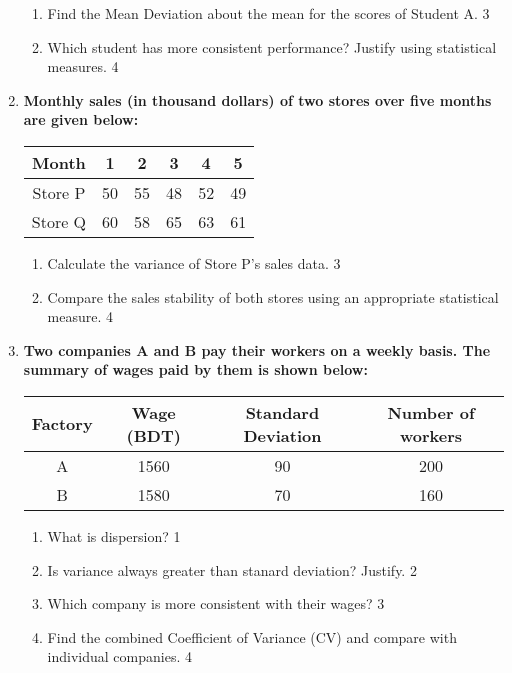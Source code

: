 \documentclass[a4paper,oneside]{book}
\begin{document}
\begin{enumerate}
  \begin{enumerate}
    \item  
	Find the Mean Deviation about the mean for the scores of Student A.  \hfill 3  
    \item  
	Which student has more consistent performance? Justify using statistical measures.  \hfill 4  
\end{enumerate}  

\item  
  \textbf{Monthly sales (in thousand dollars) of two stores over five months are given below:}

\begin{table}[h]
\centering
\begin{tabular}{c|ccccc}
Month     & 1  & 2  & 3  & 4  & 5  \\ \hline
Store P  & 50 & 55 & 48 & 52 & 49 \\
Store Q  & 60 & 58 & 65 & 63 & 61
\end{tabular}
\end{table}

  \begin{enumerate}
    \item  
	Calculate the variance of Store P’s sales data.  \hfill 3  
    \item  
	Compare the sales stability of both stores using an appropriate statistical measure.  \hfill 4  
\end{enumerate}  


 \item
	  \textbf{Two companies A and B pay their workers on a weekly basis. The summary of wages paid by them is shown below:} 
	  
	  \begin{table}[h]
	  \centering
\begin{tabular}{c|ccc}
Factory & Wage (BDT) & Standard Deviation & Number of workers \\ \hline
A       & 1560       & 90                 & 200               \\ 
B       & 1580       & 70                 & 160              
\end{tabular}
\end{table}
  
  \begin{enumerate}
    \item
	What is dispersion? \hfill 1
    \item
	Is variance always greater than stanard deviation? Justify. \hfill 2
    \item  
	Which company is more consistent with their wages? \hfill 3
    \item
	Find the combined Coefficient of Variance (CV) and compare with individual companies. \hfill 4
  \end{enumerate}
  


\end{enumerate}
\end{document}

